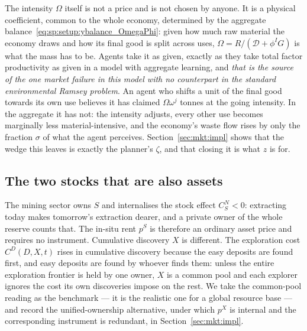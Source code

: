 The intensity $\Omega$ itself is not a price and is not chosen by anyone. It is a physical coefficient, common to the whole economy, determined by the aggregate balance~\eqref{eq:sp:setup:ybalance_OmegaPhi}: given how much raw material the economy draws and how its final good is split across uses, $\Omega=R/\left(\mathcal D+\phi^IG\right)$ is what the mass has to be. Agents take it as given, exactly as they take total factor productivity as given in a model with aggregate learning, and \emph{that is the source of the one market failure in this model with no counterpart in the standard environmental Ramsey problem}. An agent who shifts a unit of the final good towards its own use believes it has claimed $\Omega\omega^j$ tonnes at the going intensity. In the aggregate it has not: the intensity adjusts, every other use becomes marginally less material-intensive, and the economy's waste flow rises by only the fraction $\sigma$ of what the agent perceives. Section~\ref{sec:mkt:impl} shows that the wedge this leaves is exactly the planner's $\zeta$, and that closing it is what $z$ is for.

\subsection{The two stocks that are also assets}\label{sec:mkt:setup:stocks}

 The mining sector owns $S$ and internalises the stock effect $C^N_S<0$: extracting today makes tomorrow's extraction dearer, and a private owner of the whole reserve counts that. The in-situ rent $p^S$ is therefore an ordinary asset price and requires no instrument. Cumulative discovery $X$ is different. The exploration cost $C^D\left(D,X,t\right)$ rises in cumulative discovery because the easy deposits are found first, and easy deposits are found by whoever finds them: unless the entire exploration frontier is held by one owner, $X$ is a common pool and each explorer ignores the cost its own discoveries impose on the rest. We take the common-pool reading as the benchmark --- it is the realistic one for a global resource base --- and record the unified-ownership alternative, under which $p^X$ is internal and the corresponding instrument is redundant, in Section~\ref{sec:mkt:impl}.

